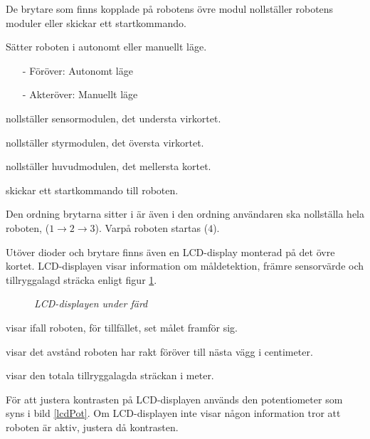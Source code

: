 \documentclass[11pt]{article}
\begin{document}
De brytare som finns kopplade på robotens övre modul nollställer robotens moduler eller skickar ett startkommando. 
\begin{description}[style=unboxed, leftmargin=0cm]
  \item[Brytare 1] Sätter roboten i autonomt eller manuellt läge. 
    \begin{itemize}
      \setlength\itemsep{-0.5em}
      \item[-] Föröver: Autonomt läge
      \item[-] Akteröver: Manuellt läge
    \end{itemize}
  \item[Brytare 2] nollställer sensormodulen, det understa virkortet.
  \item[Brytare 3] nollställer styrmodulen, det översta virkortet.
  \item[Brytare 4] nollställer huvudmodulen, det mellersta kortet.
  \item[Brytare 5] skickar ett startkommando till roboten.
\end{description}

Den ordning brytarna sitter i är även i den ordning användaren ska nollställa hela roboten, ($1 \rightarrow 2 \rightarrow 3$). Varpå roboten startas ($4$).

Utöver dioder och brytare finns även en LCD-display monterad på det övre kortet. LCD-displayen visar information om måldetektion, främre sensorvärde och tillryggalagd sträcka enligt figur \ref{lcd}.

\begin{figure}[htbp]
	\centering
	
	\caption{\textit{LCD-displayen under färd} \label{lcd}}
\end{figure}

\begin{description}[style=unboxed, leftmargin=0cm]
  \item[Target] visar ifall roboten, för tillfället, set målet framför sig.
  \item[Forw] visar det avstånd roboten har rakt föröver till nästa vägg i centimeter.
  \item[Trip] visar den totala tillryggalagda sträckan i meter.
\end{description}

För att justera kontrasten på LCD-displayen används den potentiometer som syns i bild \ref{lcdPot}. Om LCD-displayen inte visar någon information tror att roboten är aktiv, justera då kontrasten.
\end{document}
